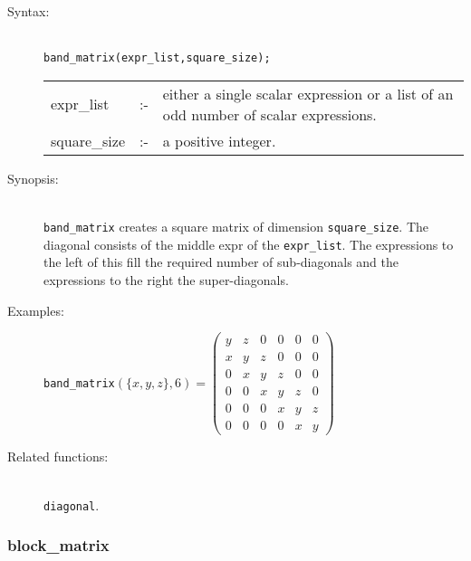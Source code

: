 \begin{description}
\item[Syntax:]\mbox{}\\
\texttt{band\_matrix(expr\_list,square\_size);}\\[2mm]
\begin{tabular}{l l p{.72\linewidth}}
expr\_list  &:-&
either a single scalar expression or a list of an odd number of scalar
expressions. \\
square\_size &:-& a positive integer.
\end{tabular}


\item[Synopsis:]\mbox{}\\
                \texttt{band\_matrix} creates a square matrix of
                dimension \texttt{square\_size}. The diagonal consists of the
                middle expr of the \texttt{expr\_list}. The expressions to the
                left of this fill the required number of sub-diagonals and the
                expressions to the right the super-diagonals.

\item[Examples:]
\begin{flushleft}
\texttt{band\_matrix}\((\{x,y,z\},6) =
 \begin{pmatrix} y & z & 0 & 0 & 0 & 0 \\
                 x & y & z & 0 & 0 & 0 \\
                 0 & x & y & z & 0 & 0 \\
                 0 & 0 & x & y & z & 0 \\
                 0 & 0 & 0 & x & y & z \\
                 0 & 0 & 0 & 0 & x & y
 \end{pmatrix}\)
\end{flushleft}

\item[Related functions:]\mbox{}\\
 \texttt{diagonal}.
\end{description}


\subsubsection{block\_matrix}
\label{linalg:block_matrix}

